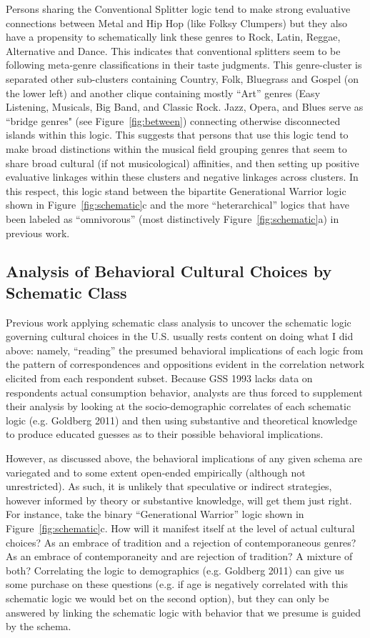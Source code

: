 \documentclass[preprint,12pt]{elsarticle}
\begin{document}
Persons sharing the Conventional Splitter logic tend to make strong evaluative connections between Metal and Hip Hop (like Folksy Clumpers) but they also have a propensity to schematically link these genres to Rock, Latin, Reggae, Alternative and Dance. This indicates that conventional splitters seem to be following meta-genre classifications in their taste judgments. This genre-cluster is separated other sub-clusters containing Country, Folk, Bluegrass and Gospel (on the lower left) and another clique containing  mostly ``Art'' genres (Easy Listening, Musicals, Big Band,  and Classic Rock. Jazz, Opera, and Blues serve as ``bridge genres" (see Figure~\ref{fig:between}) connecting otherwise disconnected islands within this logic. This suggests that persons that use this logic tend to make broad distinctions within the musical field grouping genres that seem to share broad cultural (if not musicological) affinities, and then setting up positive evaluative linkages within these clusters and negative linkages across clusters. In this respect, this logic stand between the bipartite Generational Warrior logic shown in Figure~\ref{fig:schematic}c and the more ``heterarchical'' logics that have been labeled as ``omnivorous'' (most distinctively Figure~\ref{fig:schematic}a) in previous work. 
 
\subsection{Analysis of Behavioral Cultural Choices by Schematic Class}
Previous work applying schematic class analysis to uncover the schematic logic governing cultural choices in the U.S. usually rests content on doing what I did above: namely, ``reading'' the presumed behavioral implications of each logic from the pattern of correspondences and oppositions evident in the correlation network elicited from each respondent subset. Because GSS 1993 lacks data on respondents actual consumption behavior, analysts are thus forced to supplement their analysis by looking at the socio-demographic correlates of each schematic logic (e.g. Goldberg 2011) and then using substantive and theoretical knowledge to produce educated guesses as to their possible behavioral implications. 

However, as discussed above, the behavioral implications of any given schema are variegated and to some extent open-ended empirically (although not unrestricted). As such, it is unlikely that speculative or indirect strategies, however informed by theory or substantive knowledge, will get them just right. For instance, take the binary ``Generational Warrior'' logic shown in Figure~\ref{fig:schematic}c. How will it manifest itself at the level of actual cultural choices? As an embrace of tradition and a rejection of contemporaneous genres? As an embrace of contemporaneity and are rejection of tradition? A mixture of both? Correlating the logic to demographics (e.g. Goldberg 2011) can give us some purchase on these questions (e.g. if age is negatively correlated with this schematic logic we would bet on the second option), but they can only be answered by linking the schematic logic with behavior that we presume is guided by the schema.
\end{document}
